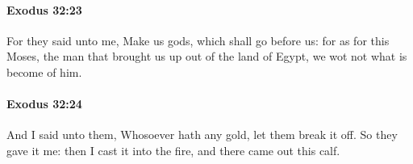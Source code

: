 		\paragraph{Exodus 32:23} %
			\label{EXODUS-32-23}

			For they said unto me, Make us gods, which shall go before us: for as for this Moses, the man that brought us up out of the land of Egypt, we wot not what is become of him.


		\paragraph{Exodus 32:24} %
			\label{EXODUS-32-24}

			And I said unto them, Whosoever hath any gold, let them break it off. So they gave it me: then I cast it into the fire, and there came out this calf.


